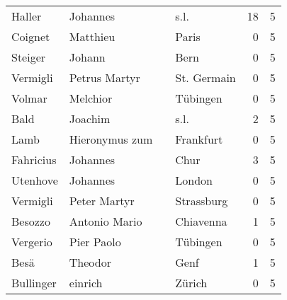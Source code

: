 \begin{tabular}{llllrr}
                   Haller &                           Johannes &             &                                        s.l. &         18 &         5 \\
                  Coignet &                           Matthieu &             &                                       Paris &          0 &         5 \\
                  Steiger &                             Johann &             &                                        Bern &          0 &         5 \\
                 Vermigli &                      Petrus Martyr &             &                                 St. Germain &          0 &         5 \\
                   Volmar &                           Melchior &             &                                    Tübingen &          0 &         5 \\
                     Bald &                            Joachim &             &                                        s.l. &          2 &         5 \\
                     Lamb &                     Hieronymus zum &             &                                   Frankfurt &          0 &         5 \\
                Fahricius &                           Johannes &             &                                        Chur &          3 &         5 \\
                 Utenhove &                           Johannes &             &                                      London &          0 &         5 \\
                 Vermigli &                       Peter Martyr &             &                                  Strassburg &          0 &         5 \\
                  Besozzo &                      Antonio Mario &             &                                   Chiavenna &          1 &         5 \\
                 Vergerio &                         Pier Paolo &             &                                    Tübingen &          0 &         5 \\
                     Besä &                            Theodor &             &                                        Genf &          1 &         5 \\
                Bullinger &                            einrich &             &                                      Zürich &          0 &         5 \\

\end{tabular}
